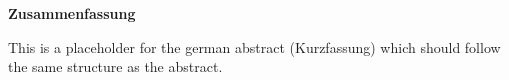 \thispagestyle{empty}
\vspace*{0.2cm}

\begin{center}
    \textbf{Zusammenfassung} \label{zusammenfassung}
\end{center}

\vspace*{0.2cm}

\noindent 
This is a placeholder for the german abstract (Kurzfassung) which should follow the same structure as the abstract.
